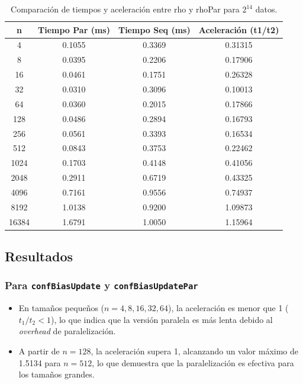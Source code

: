 \documentclass{article}
\begin{document}
  \begin{table}[H]
  \centering
  \begin{tabular}{@{}cccc@{}}
    \toprule
    \textbf{n} & \textbf{Tiempo Par (ms)} & \textbf{Tiempo Seq (ms)} & \textbf{Aceleración (t1/t2)} \\ \midrule
    4 & 0.1055 & 0.3369 & 0.31315 \\ 
    8 & 0.0395 & 0.2206 & 0.17906 \\ 
    16 & 0.0461 & 0.1751 & 0.26328 \\ 
    32 & 0.0310 & 0.3096 & 0.10013 \\ 
    64 & 0.0360 & 0.2015 & 0.17866 \\ 
    128 & 0.0486 & 0.2894 & 0.16793 \\ 
    256 & 0.0561 & 0.3393 & 0.16534 \\ 
    512 & 0.0843 & 0.3753 & 0.22462 \\ 
    1024 & 0.1703 & 0.4148 & 0.41056 \\ 
    2048 & 0.2911 & 0.6719 & 0.43325 \\ 
    4096 & 0.7161 & 0.9556 & 0.74937 \\ 
    8192 & 1.0138 & 0.9200 & 1.09873 \\
    16384 & 1.6791 & 1.0050 & 1.15964 \\
    \bottomrule
  \end{tabular}
  \caption{Comparación de tiempos y aceleración entre rho y rhoPar para $2^14$ datos.}
  \label{tab:comparison}
  \end{table}

  \subsection{Resultados}
    \subsubsection{Para \texttt{confBiasUpdate} y \texttt{confBiasUpdatePar}}
    \begin{itemize}
        \item En tamaños pequeños ($n = 4, 8, 16, 32, 64$), la aceleración es menor que 1 ($t_1/t_2 < 1$), lo que indica que la versión paralela es más lenta debido al \textit{overhead} de paralelización.
        \item A partir de $n = 128$, la aceleración supera 1, alcanzando un valor máximo de 1.5134 para $n = 512$, lo que demuestra que la paralelización es efectiva para los tamaños grandes.
    \end{itemize}
\end{document}
